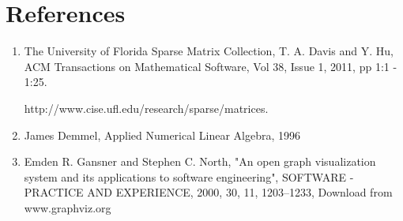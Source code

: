\documentclass[11pt, oneside]{article}   	%
\begin{document}
\section{References}

\begin{enumerate}

\item The University of Florida Sparse Matrix Collection, T. A. Davis and Y. Hu, ACM Transactions on Mathematical Software, Vol 38, Issue 1, 2011, pp 1:1 - 1:25.

http://www.cise.ufl.edu/research/sparse/matrices.

\item James Demmel, Applied Numerical Linear Algebra, 1996

\item Emden R. Gansner and Stephen C. North, "An open graph visualization system and its applications to software engineering", SOFTWARE - PRACTICE AND EXPERIENCE, 2000, 30, 11, 1203--1233, Download from www.graphviz.org

\end{enumerate}
\end{document}
